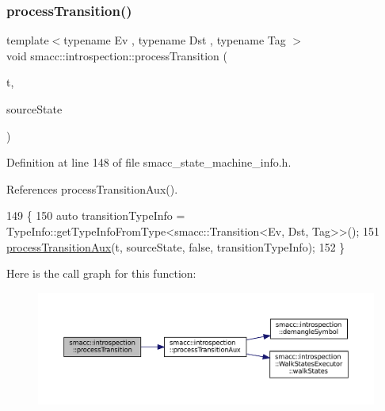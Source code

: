 \subsubsection{\texorpdfstring{process\+Transition()}{processTransition()}\hspace{0.1cm}{\footnotesize\ttfamily [2/4]}}
{\footnotesize\ttfamily template$<$typename Ev , typename Dst , typename Tag $>$ \\
void smacc\+::introspection\+::process\+Transition (\begin{DoxyParamCaption}\item[{\hyperlink{classsmacc_1_1Transition}{smacc\+::\+Transition}$<$ Ev, Dst, Tag $>$ $\ast$}]{t,  }\item[{std\+::shared\+\_\+ptr$<$ \hyperlink{classsmacc_1_1introspection_1_1SmaccStateInfo}{Smacc\+State\+Info} $>$ \&}]{source\+State }\end{DoxyParamCaption})}



Definition at line 148 of file smacc\+\_\+state\+\_\+machine\+\_\+info.\+h.



References process\+Transition\+Aux().


\begin{DoxyCode}
149 \{
150     \textcolor{keyword}{auto} transitionTypeInfo = TypeInfo::getTypeInfoFromType<smacc::Transition<Ev, Dst, Tag>>();
151     \hyperlink{namespacesmacc_1_1introspection_a208cd71dc5579090d40b3d3b9efb28a6}{processTransitionAux}(t, sourceState, \textcolor{keyword}{false}, transitionTypeInfo);
152 \}
\end{DoxyCode}
Here is the call graph for this function\+:
\nopagebreak
\begin{figure}[H]
\begin{center}
\leavevmode
\includegraphics[width=350pt]{namespacesmacc_1_1introspection_a4f5403936b7b501da0c6fa9f067e09fd_cgraph}
\end{center}
\end{figure}
\mbox{\label{namespacesmacc_1_1introspection_a1083a0c41469be69ec8317eb7e95d3f0}} 
